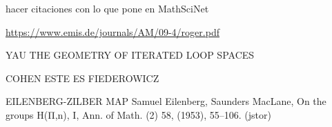 \documentclass[TFM.tex]{subfiles}
\begin{document}
%


\begin{thebibliography}{}






 hacer citaciones con lo que pone en MathSciNet

 \url{https://www.emis.de/journals/AM/09-4/roger.pdf}





 YAU
 THE GEOMETRY OF ITERATED LOOP SPACES

 COHEN
 ESTE ES FIEDEROWICZ

 EILENBERG-ZILBER MAP Samuel Eilenberg, Saunders MacLane, On the groups H(Π,n), I, Ann. of Math. (2) 58, (1953), 55–106. (jstor)





\end{thebibliography}
\end{document}
